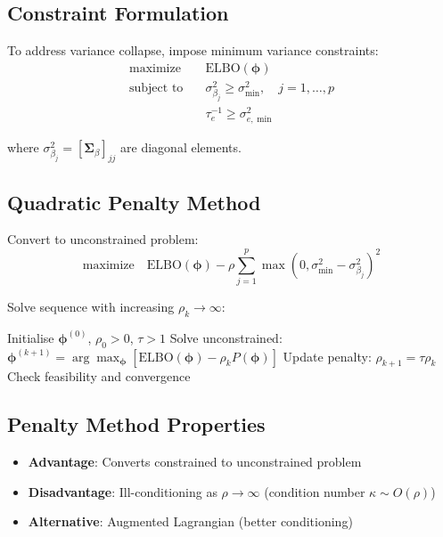 \documentclass[11pt]{article}
\newcommand{\ELBO}{\text{ELBO}}
\begin{document}
\subsection{Constraint Formulation}

To address variance collapse, impose minimum variance constraints:
\begin{align}
\text{maximize} \quad & \ELBO(\bm{\phi})\\
\text{subject to} \quad & \sigma^2_{\beta_j} \geq \sigma^2_{\min}, \quad j = 1,\ldots,p\\
& \tau_e^{-1} \geq \sigma^2_{e,\min}
\end{align}

where $\sigma^2_{\beta_j} = [\bm{\Sigma}_\beta]_{jj}$ are diagonal elements.

\subsection{Quadratic Penalty Method}

Convert to unconstrained problem:
\begin{equation}
\text{maximize} \quad \ELBO(\bm{\phi}) - \rho \sum_{j=1}^{p} \max(0, \sigma^2_{\min} - \sigma^2_{\beta_j})^2
\end{equation}

Solve sequence with increasing $\rho_k \to \infty$:
\begin{algorithm}
\caption{Penalty Method for Constrained VI}
\begin{algorithmic}[1]
\State Initialise $\bm{\phi}^{(0)}$, $\rho_0 > 0$, $\tau > 1$
    \State Solve unconstrained: $\bm{\phi}^{(k+1)} = \arg\max_{\bm{\phi}} \left[\ELBO(\bm{\phi}) - \rho_k P(\bm{\phi})\right]$
    \State Update penalty: $\rho_{k+1} = \tau \rho_k$
    \State Check feasibility and convergence
\EndFor
\end{algorithmic}
\end{algorithm}

\subsection{Penalty Method Properties}

\begin{itemize}
\item \textbf{Advantage}: Converts constrained to unconstrained problem
\item \textbf{Disadvantage}: Ill-conditioning as $\rho \to \infty$ (condition number $\kappa \sim O(\rho)$)
\item \textbf{Alternative}: Augmented Lagrangian (better conditioning)
\end{itemize}
\end{document}
